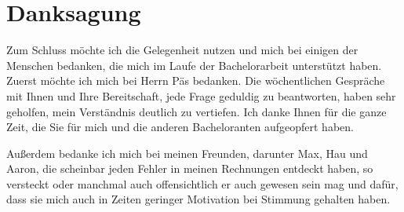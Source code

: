 \chapter{Danksagung}

Zum Schluss möchte ich die Gelegenheit nutzen und mich bei einigen der Menschen bedanken, die mich im Laufe der Bachelorarbeit unterstützt haben.
Zuerst möchte ich mich bei Herrn Päs bedanken.
Die wöchentlichen Gespräche mit Ihnen und Ihre Bereitschaft, jede Frage geduldig zu beantworten, haben sehr geholfen, mein Verständnis deutlich zu vertiefen.
Ich danke Ihnen für die ganze Zeit, die Sie für mich und die anderen Bacheloranten aufgeopfert haben.

Außerdem bedanke ich mich bei meinen Freunden, darunter Max, Hau und Aaron, die scheinbar jeden Fehler in meinen Rechnungen entdeckt haben, so versteckt oder manchmal auch offensichtlich er auch gewesen sein mag
und dafür, dass sie mich auch in Zeiten geringer Motivation bei Stimmung gehalten haben.
